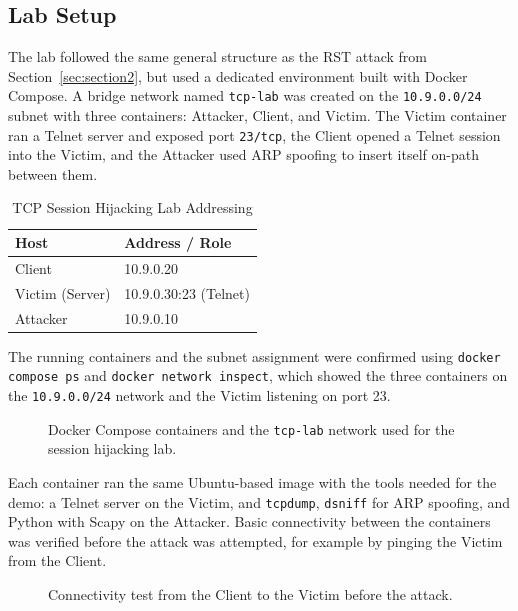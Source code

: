 \subsection{Lab Setup}

The lab followed the same general structure as the RST attack from Section~\ref{sec:section2}, but used a dedicated environment built with Docker Compose. A bridge network named \texttt{tcp-lab} was created on the \texttt{10.9.0.0/24} subnet with three containers: Attacker, Client, and Victim. The Victim container ran a Telnet server and exposed port \texttt{23/tcp}, the Client opened a Telnet session into the Victim, and the Attacker used ARP spoofing to insert itself on-path between them.

\begin{table}[H]
\centering
\caption{TCP Session Hijacking Lab Addressing}
\label{tab:hj_addresses}
\begin{tabular}{|l|l|}
\hline
\textbf{Host} & \textbf{Address / Role} \\
\hline
Client   & 10.9.0.20 \\
Victim (Server) & 10.9.0.30:23 (Telnet) \\
Attacker & 10.9.0.10 \\
\hline
\end{tabular}
\end{table}

The running containers and the subnet assignment were confirmed using \texttt{docker compose ps} and \texttt{docker network inspect}, which showed the three containers on the \texttt{10.9.0.0/24} network and the Victim listening on port 23.

\begin{figure}[!t]
\centering
{}
\caption{Docker Compose containers and the \texttt{tcp-lab} network used for the session hijacking lab.}
\label{fig:hj_network}
\end{figure}

Each container ran the same Ubuntu-based image with the tools needed for the demo: a Telnet server on the Victim, and \texttt{tcpdump}, \texttt{dsniff} for ARP spoofing, and Python with Scapy on the Attacker. Basic connectivity between the containers was verified before the attack was attempted, for example by pinging the Victim from the Client.

\begin{figure}[!t]
\centering
{}
\caption{Connectivity test from the Client to the Victim before the attack.}
\label{fig:hj_ping}
\end{figure}

